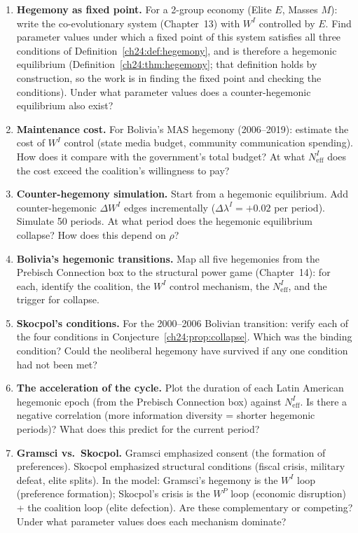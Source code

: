 \documentclass[../structural_economics_book.tex]{subfiles}
\begin{document}
\begin{enumerate}[label=\textbf{24.\arabic*}, leftmargin=3em]

\item \textbf{Hegemony as fixed point.} For a 2-group economy (Elite $E$, Masses $M$): write the co-evolutionary system (Chapter~13) with $W^I$ controlled by $E$. Find parameter values under which a fixed point of this system satisfies all three conditions of Definition~\ref{ch24:def:hegemony}, and is therefore a hegemonic equilibrium (Definition~\ref{ch24:thm:hegemony}; that definition holds by construction, so the work is in finding the fixed point and checking the conditions). Under what parameter values does a counter-hegemonic equilibrium also exist?

\item \textbf{Maintenance cost.} For Bolivia's MAS hegemony (2006--2019): estimate the cost of $W^I$ control (state media budget, community communication spending). How does it compare with the government's total budget? At what $N_{\text{eff}}^I$ does the cost exceed the coalition's willingness to pay?

\item \textbf{Counter-hegemony simulation.} Start from a hegemonic equilibrium. Add counter-hegemonic $\Delta W^I$ edges incrementally ($\Delta\lambda^I = +0.02$ per period). Simulate 50 periods. At what period does the hegemonic equilibrium collapse? How does this depend on $\rho$?

\item \textbf{Bolivia's hegemonic transitions.} Map all five hegemonies from the Prebisch Connection box to the structural power game (Chapter~14): for each, identify the coalition, the $W^I$ control mechanism, the $N_{\text{eff}}^I$, and the trigger for collapse.

\item \textbf{Skocpol's conditions.} For the 2000--2006 Bolivian transition: verify each of the four conditions in Conjecture~\ref{ch24:prop:collapse}. Which was the binding condition? Could the neoliberal hegemony have survived if any one condition had not been met?

\item \textbf{The acceleration of the cycle.} Plot the duration of each Latin American hegemonic epoch (from the Prebisch Connection box) against $N_{\text{eff}}^I$. Is there a negative correlation (more information diversity = shorter hegemonic periods)? What does this predict for the current period?

\item \textbf{Gramsci vs.\ Skocpol.} Gramsci emphasized consent (the formation of preferences). Skocpol emphasized structural conditions (fiscal crisis, military defeat, elite splits). In the model: Gramsci's hegemony is the $W^I$ loop (preference formation); Skocpol's crisis is the $W^P$ loop (economic disruption) + the coalition loop (elite defection). Are these complementary or competing? Under what parameter values does each mechanism dominate?
\end{enumerate}
\end{document}
